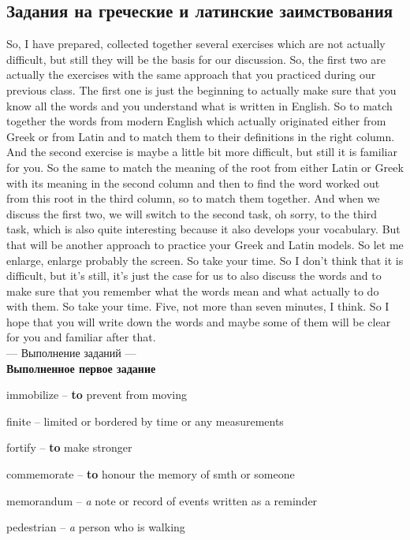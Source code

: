 \documentclass[main.tex]{subfiles}
\begin{document}
\subsection{Задания на греческие и латинские заимствования}

So, I have prepared, collected together several exercises which are not actually difficult, but still they will be the basis for our discussion.
So, the first two are actually the exercises with the same approach that you practiced during our previous class.
The first one is just the beginning to actually make sure that you know all the words and you understand what is written in English.
So to match together the words from modern English which actually originated either from Greek or from Latin and to match them to their definitions in the right column.
And the second exercise is maybe a little bit more difficult, but still it is familiar for you.
So the same to match the meaning of the root from either Latin or Greek with its meaning in the second column and then to find the word worked out from this root in the third column, so to match them together.
And when we discuss the first two, we will switch to the second task, oh sorry, to the third task, which is also quite interesting because it also develops your vocabulary.
But that will be another approach to practice your Greek and Latin models.
So let me enlarge, enlarge probably the screen.
So take your time.
So I don't think that it is difficult, but it's still, it's just the case for us to also discuss the words and to make sure that you remember what the words mean and what actually to do with them.
So take your time.
Five, not more than seven minutes, I think.
So I hope that you will write down the words and maybe some of them will be clear for you and familiar after that.
\\

--- Выполнение заданий ---
\\

\textbf{Выполненное первое задание}

immobilize -- \textbf{to} prevent from moving

finite -- limited or bordered by time or any measurements

fortify -- \textbf{to} make stronger

commemorate -- \textbf{to} honour the memory of smth or someone

memorandum -- \textit{a} note or record of events written as a reminder

pedestrian -- \textit{a} person who is walking
\end{document}
